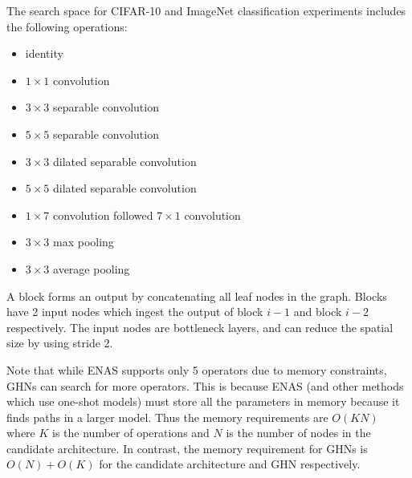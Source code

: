 \documentclass{article} %
\begin{document}



\newpage
The search space for CIFAR-10 and ImageNet classification experiments includes the following operations:
\begin{itemize}
\item identity
\item $1\times1$ convolution
\item $3\times3$ separable convolution
\item $5\times5$ separable convolution
\item $3\times3$ dilated separable convolution
\item $5\times5$ dilated separable convolution
\item $1\times7$ convolution followed $7\times1$ convolution
\item $3\times3$ max pooling
\item $3\times3$ average pooling
\end{itemize}
A block forms an output by concatenating all leaf nodes in the graph. Blocks have 2 input nodes which ingest the output of block $i-1$ and block $i-2$ respectively. The input nodes are bottleneck layers, and can reduce the spatial size by using stride 2. 

Note that while ENAS supports only 5 operators due to memory constraints, GHNs can search for more operators. 
This is because ENAS (and other methods which use one-shot models) must store all the parameters in memory because it finds paths in a larger model.
Thus the memory requirements are $O(KN)$ where $K$ is the number of operations and $N$ is the number of nodes in the candidate architecture. 
In contrast, the memory requirement for GHNs is $O(N) + O(K)$ for the candidate architecture and GHN respectively. 
\end{document}
